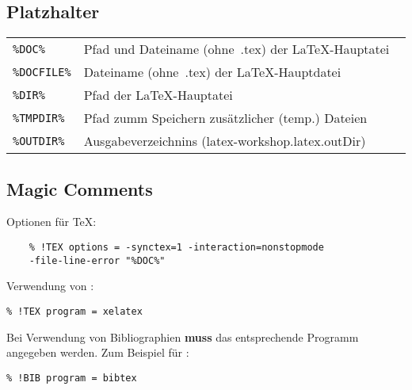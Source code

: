 \documentclass[8pt]{extarticle} %
\begin{document}
\begin{multicols}{3}
\subsection{Platzhalter}
\vspace*{1ex}
  \begin{tabular}{L{0.17\linewidth} L{0.83\linewidth}}
  \tt \%DOC\% & Pfad und Dateiname (ohne\ .tex) der \LaTeX-Hauptatei\\
  \tt \%DOCFILE\%  & Dateiname (ohne\ .tex) der \LaTeX-Hauptdatei \\
	\tt \%DIR\% & Pfad der \LaTeX-Hauptatei\\
	\tt \%TMPDIR\% & Pfad zumm Speichern zusätzlicher (temp.) Dateien\\
	\tt \%OUTDIR\% & Ausgabeverzeichnins (latex-workshop.latex.outDir)\\	
  \end{tabular}

\vspace*{1ex}
\subsection{Magic Comments}
\vspace*{1ex}	
Optionen für \TeX:
	\begin{verbatim}
	% !TEX options = -synctex=1 -interaction=nonstopmode 
	-file-line-error "%DOC%"
\end{verbatim}
\vspace*{1ex}
Verwendung von :
\begin{verbatim}
% !TEX program = xelatex
\end{verbatim}
\vspace*{1ex}
Bei Verwendung von Bibliographien \textbf{muss} das entsprechende Programm angegeben werden. Zum Beispiel für :
\begin{verbatim}
% !BIB program = bibtex
\end{verbatim}	
  
\end{multicols}
\end{document}
